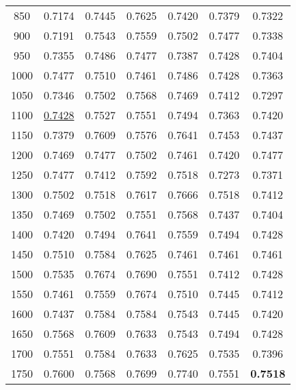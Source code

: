 \documentclass[11pt,a4paper]{article}
\begin{document}
\begin{table*}[th!]
{\begin{tabular}{c|cccccc@{}}
850            & 0.7174  & 0.7445     & 0.7625   & 0.7420      & 0.7379         & 0.7322            \\
900            & 0.7191  & 0.7543     & 0.7559   & 0.7502      & 0.7477         & 0.7338            \\
950            & 0.7355  & 0.7486     & 0.7477   & 0.7387      & 0.7428         & 0.7404            \\
1000           & 0.7477  & 0.7510     & 0.7461   & 0.7486      & 0.7428         & 0.7363            \\
1050           & 0.7346  & 0.7502     & 0.7568   & 0.7469      & 0.7412         & 0.7297            \\
1100           & \underline{0.7428}  & 0.7527     & 0.7551   & 0.7494      & 0.7363         & 0.7420            \\
1150           & 0.7379  & 0.7609     & 0.7576   & 0.7641      & 0.7453         & 0.7437            \\
1200           & 0.7469  & 0.7477     & 0.7502   & 0.7461      & 0.7420         & 0.7477            \\
1250           & 0.7477  & 0.7412     & 0.7592   & 0.7518      & 0.7273         & 0.7371            \\
1300           & 0.7502  & 0.7518     & 0.7617   & 0.7666      & 0.7518         & 0.7412            \\
1350           & 0.7469  & 0.7502     & 0.7551   & 0.7568      & 0.7437         & 0.7404            \\
1400           & 0.7420  & 0.7494     & 0.7641   & 0.7559      & 0.7494         & 0.7428            \\
1450           & 0.7510  & 0.7584     & 0.7625   & 0.7461      & 0.7461         & 0.7461            \\
1500           & 0.7535  & 0.7674     & 0.7690   & 0.7551      & 0.7412         & 0.7428            \\
1550           & 0.7461  & 0.7559     & 0.7674   & 0.7510      & 0.7445         & 0.7412            \\
1600           & 0.7437  & 0.7584     & 0.7584   & 0.7543      & 0.7445         & 0.7420            \\
1650           & 0.7568  & 0.7609     & 0.7633   & 0.7543      & 0.7494         & 0.7428            \\
1700           & 0.7551  & 0.7584     & 0.7633   & 0.7625      & 0.7535         & 0.7396            \\
1750           & 0.7600  & 0.7568     & 0.7699   & 0.7740      & 0.7551         & \textbf{0.7518}            \\

\end{tabular}}
\end{table*}
\end{document}

